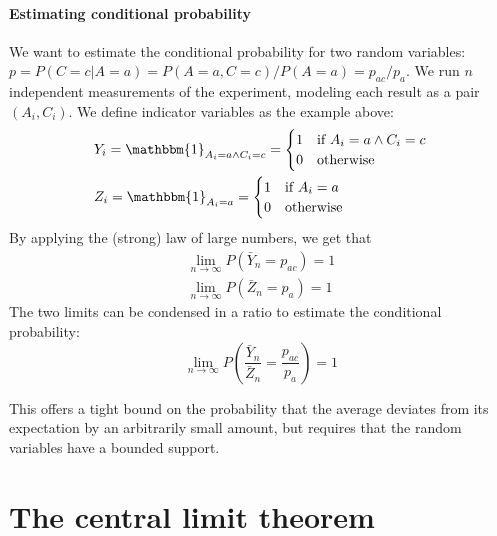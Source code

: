 \paragraph{Estimating conditional probability} We want to estimate the conditional probability for two random variables: $p = P(C = c | A = a) = P(A=a, C=c)/P(A=a) = p_{ac}/p_a$. We run $n$ independent measurements of the experiment, modeling each result as a pair $(A_i, C_i)$. We define indicator variables as the example above:
\begin{align*}
    &Y_i = \mathbbm{1}_{A_i = a \land C_i = c} = \begin{cases}
        1 & \text{if } A_i = a \land C_i = c\\
        0 & \text{otherwise}
    \end{cases}\\
    &Z_i = \mathbbm{1}_{A_i = a} = \begin{cases}
        1 & \text{if } A_i = a\\
        0 & \text{otherwise}
    \end{cases}
\end{align*}
By applying the (strong) law of large numbers, we get that
\begin{align*}
    \lim_{n \to \infty} P(\bar{Y}_n = p_{ac}) = 1 \\
    \lim_{n \to \infty} P(\bar{Z}_n = p_a) = 1
\end{align*}
The two limits can be condensed in a ratio to estimate the conditional probability:
\begin{equation*}
    \lim_{n \to \infty} P(\frac{\bar{Y}_n}{\bar{Z}_n} = \frac{p_{ac}}{p_a}) = 1
\end{equation*}

This offers a tight bound on the probability that the average deviates from its expectation by an arbitrarily small amount, but requires that the random variables have a bounded support.

\section*{The central limit theorem}

